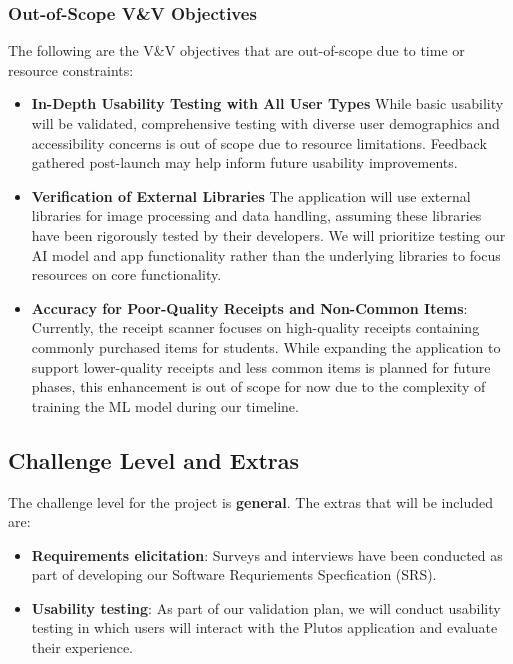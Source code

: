 \documentclass[12pt, titlepage]{article}
\begin{document}
\subsubsection{Out-of-Scope V\&V Objectives}

The following are the V\&V objectives that are out-of-scope due to time or
resource constraints:
\begin{itemize}
	\item \textbf{In-Depth Usability Testing with All User Types} While basic
usability will be validated, comprehensive testing with diverse user
demographics and accessibility concerns is out of scope due to resource
limitations. Feedback gathered post-launch may help inform future usability
improvements. 
	\item \textbf{Verification of External Libraries} The application will use
external libraries for image processing and data handling, assuming these
libraries have been rigorously tested by their developers. We will prioritize
testing our AI model and app functionality rather than the underlying libraries
to focus resources on core functionality. 
	\item \textbf{Accuracy for Poor-Quality Receipts and Non-Common Items}:
Currently, the receipt scanner focuses on high-quality receipts containing
commonly purchased items for students. While expanding the application to
support lower-quality receipts and less common items is planned for future
phases, this enhancement is out of scope for now due to the complexity of
training the ML model during our timeline.

\end{itemize}



\subsection{Challenge Level and Extras}

The challenge level for the project is \textbf{general}. The extras that will be included are: 
\begin{itemize}
	\item \textbf{Requirements elicitation}: Surveys and interviews have been conducted
	as part of developing our Software Requriements Specfication (SRS).
	\item \textbf{Usability testing}: As part of our validation plan, we will conduct
	usability testing in which users will interact with the Plutos application and
	evaluate their experience.
\end{itemize}
\end{document}
